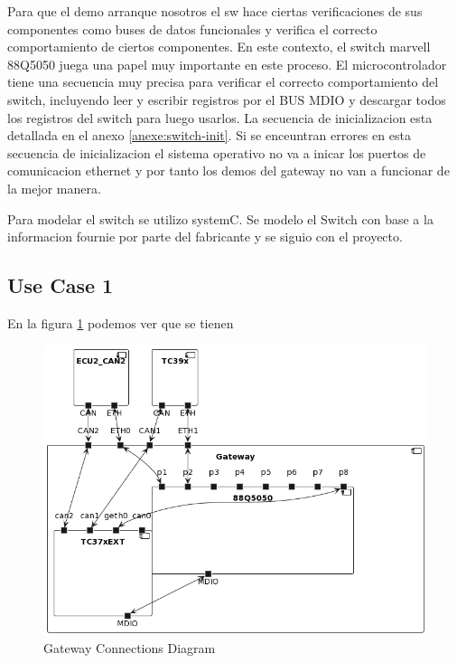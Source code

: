 Para que el demo arranque nosotros el sw hace ciertas verificaciones de sus componentes como buses de datos funcionales y verifica el correcto comportamiento de ciertos componentes. En este contexto, el switch marvell 88Q5050 juega una papel muy importante en este proceso. El microcontrolador tiene una secuencia muy precisa para verificar el correcto comportamiento del switch, incluyendo leer y escribir registros por el BUS MDIO y descargar todos los registros del switch para luego usarlos. La secuencia de inicializacion esta detallada en el anexo \ref{anexe:switch-init}. Si se enceuntran errores en esta secuencia de inicializacion el sistema operativo no va a inicar los puertos de comunicacion ethernet y por tanto los demos del gateway no van a funcionar de la mejor manera.

Para modelar el switch se utilizo systemC. Se modelo el Switch con base a la informacion fournie por parte del fabricante y se siguio con el proyecto.

\subsection{Use Case 1}

En la figura \ref{fig:connections-diagram} podemos ver que se tienen

\begin{figure}[!htb]
 \centering
 \includegraphics[width=\textwidth]{img/GWConnectionsDiagram.png}
 \caption{Gateway Connections Diagram}
 \label{fig:connections-diagram}
\end{figure}



